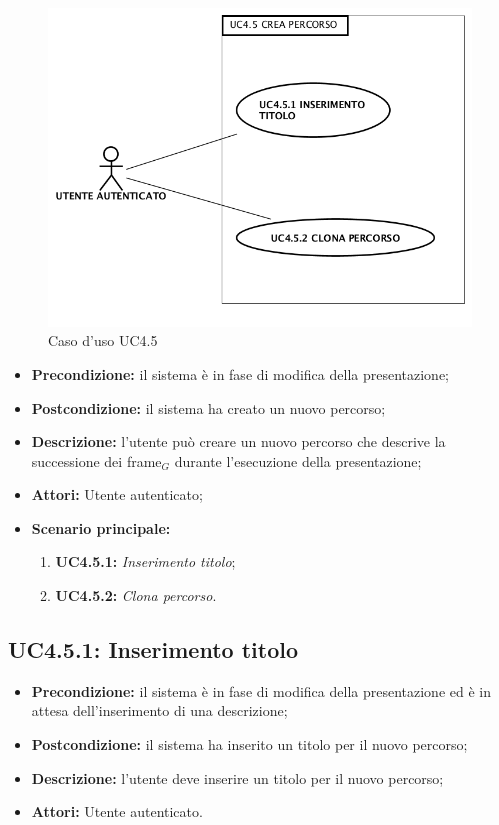 \begin{figure}[h]
	\begin{center}
	\includegraphics[scale=0.4]{diagram/UC4-5.png}
	\caption{Caso d'uso UC4.5}
	\end{center}
\end{figure}
\begin{itemize}
	\item \textbf{Precondizione:} il sistema è in fase di modifica della presentazione;
	\item \textbf{Postcondizione:} il sistema ha creato un nuovo percorso;
	\item \textbf{Descrizione:} l'utente può creare un nuovo percorso che descrive la successione dei frame$_G$ durante l'esecuzione della presentazione;
	\item \textbf{Attori:} Utente autenticato;
	\item \textbf{Scenario principale:}
	\begin{enumerate}
		\item \textbf{ UC4.5.1:} \textit{ Inserimento titolo};
		\item \textbf{ UC4.5.2:} \textit{ Clona percorso}.
	\end{enumerate}
\end{itemize}
\subsection{ UC4.5.1: Inserimento titolo}

\begin{itemize}
	\item \textbf{Precondizione:} il sistema è in fase di modifica della presentazione ed è in attesa dell'inserimento di una descrizione;
	\item \textbf{Postcondizione:} il sistema ha inserito un titolo per il nuovo percorso;
	\item \textbf{Descrizione:} l'utente deve inserire un titolo per il nuovo percorso;
	\item \textbf{Attori:} Utente autenticato.
\end{itemize}
